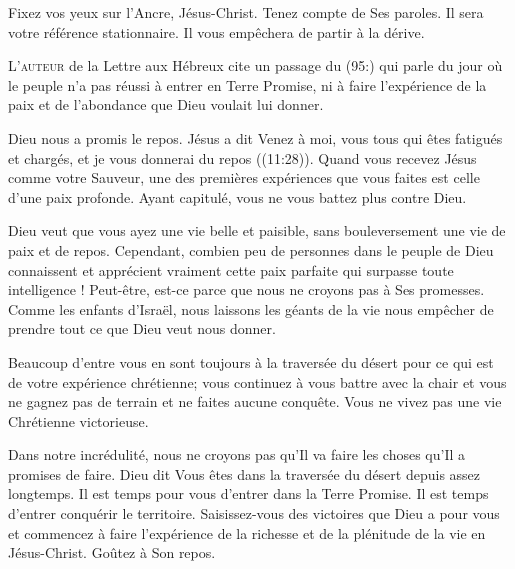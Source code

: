 Fixez vos yeux sur l'Ancre, Jésus-Christ. Tenez compte de Ses paroles.
 Il sera votre référence stationnaire.
 Il vous empêchera de partir à la dérive. 

\dvrule






\lettrine{L}{'auteur} de la Lettre aux Hébreux
 cite un passage du (95:) qui parle du jour où le peuple
 n'a pas réussi à entrer en Terre Promise, ni à faire l'expérience
 de la paix et de l'abondance que Dieu voulait lui donner. 

Dieu nous a promis le repos. Jésus a dit\frcolon{} 
 \Og Venez à moi, vous tous qui êtes fatigués et chargés,
 et je vous donnerai du repos \Fg{} ((11:28)).
 Quand vous recevez Jésus comme votre Sauveur, une des premières expériences
 que vous faites est celle d'une paix profonde.
 Ayant capitulé, vous ne vous battez plus contre Dieu. 


Dieu veut que vous ayez une vie belle et paisible, sans bouleversement
 \ocadr une vie de paix et de repos.
 Cependant, combien peu de personnes dans le peuple de Dieu connaissent
 et apprécient vraiment cette paix parfaite qui surpasse toute intelligence !
 Peut-être,  est-ce parce que nous ne croyons pas
 à Ses promesses.
 Comme les enfants d'Israël, nous laissons les géants de la vie
 nous empêcher de prendre tout ce que Dieu veut nous donner. 

Beaucoup d'entre vous en sont toujours à la traversée du désert
 pour ce qui est de votre expérience chrétienne;
 vous continuez à vous battre avec la chair et vous ne gagnez pas de terrain
 et ne faites aucune conquête. Vous ne vivez pas
 une vie Chrétienne 
 victorieuse. 

Dans notre incrédulité, nous ne croyons pas qu'Il va faire les choses
 qu'Il a promises 
 de faire.
 Dieu dit\frcolon{} 
 \Og Vous êtes dans la traversée du désert depuis assez longtemps.
 Il est temps pour vous d'entrer dans la Terre Promise.
 Il est temps d'entrer conquérir le territoire. \Fg{}
 Saisissez-vous 
 des victoires que Dieu a pour vous et commencez à faire l'expérience
 de la richesse et de la plénitude de la vie en Jésus-Christ.
 Goûtez à Son repos. 

